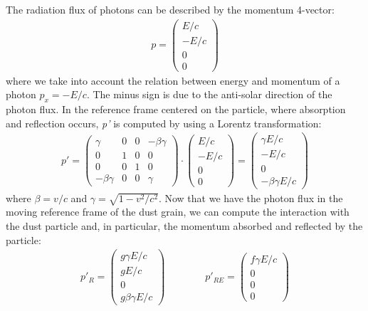 \documentclass[12pt,a4paper]{article}
\begin{document}
The radiation flux of photons can be described by the momentum 4-vector:
\begin{align}
\label{52}
    p=
    \begin{pmatrix}
    E/c \\
    -E/c \\
    0 \\
    0
    \end{pmatrix}
\end{align}
where we take into account the relation between energy and momentum of a photon $p_x=−E/c$. The minus sign is due to the anti-solar direction of the photon flux. In the reference frame centered on the particle, where absorption and reflection occurs, \textit{p'} is computed by using a Lorentz transformation:
\begin{align}
p'=
    \begin{pmatrix}
    \gamma & 0 & 0 & -\beta\gamma \\
    0 & 1 & 0 & 0 \\
    0 & 0 & 1 & 0 \\
    -\beta\gamma & 0 & 0 & \gamma
    \end{pmatrix}\cdot
    \begin{pmatrix}
    E/c \\
    -E/c \\
    0 \\
    0
    \end{pmatrix}=
    \begin{pmatrix}
    \gamma E/c \\
    -E/c \\
    0 \\
    -\beta\gamma E/c
    \end{pmatrix}
\end{align}
where $\beta=v/c$ and $\gamma=\sqrt{1-v^2/c^2}$.  Now that we have the photon flux in the moving reference frame of the dust grain, we can compute the interaction with the dust particle and, in particular, the momentum absorbed and reflected by the particle:
\begin{align}
    p'_R=
    \begin{pmatrix}
    g\gamma E/c \\
    gE/c \\
    0 \\
    g\beta\gamma E/c
    \end{pmatrix} \quad\quad\quad\quad
    p'_{RE}=
    \begin{pmatrix}
    f\gamma E/c \\
    0 \\
    0 \\
    0
    \end{pmatrix}
\end{align} 
\end{document}
